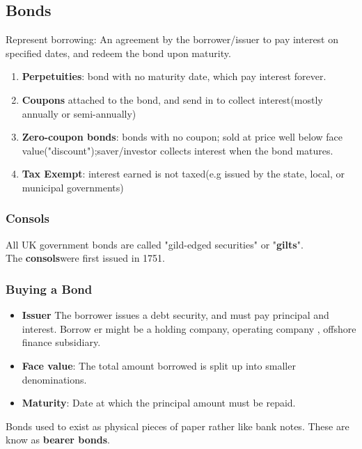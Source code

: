 \documentclass{article}
\theoremstyle{definition}
\theoremstyle{thrm}
\theoremstyle{lma}
\theoremstyle{ppst}
\theoremstyle{crlr}
\begin{document}
\subsection{Bonds}
Represent borrowing: An agreement by the borrower/issuer to pay interest on specified dates, and redeem the bond upon maturity. 
\begin{enumerate}
	\item \textbf{Perpetuities}: bond with no maturity date, which pay interest forever.
	\item \textbf{Coupons} attached to the bond, and send in to collect interest(mostly annually or semi-annually)
	\item \textbf{Zero-coupon bonds}: bonds with no coupon; sold at price well below face value("discount");saver/investor collects interest when the bond matures.
	\item \textbf{Tax Exempt}: interest earned is not taxed(e.g issued by the state, local, or municipal governments)  
\end{enumerate}
\subsubsection{Consols}
All UK government bonds are called "gild-edged securities" or "\textbf{gilts}".\\
The \textbf{consols}were first issued in 1751. 
\subsubsection{Buying a Bond}
\begin{itemize}
	\item \textbf{Issuer} The borrower issues a debt security, and must pay principal and interest. Borrow er might be a holding company, operating company , offshore finance subsidiary. 
	\item \textbf{Face value}: The total amount borrowed is split up into smaller denominations.
	\item \textbf{Maturity}: Date at which the principal amount must be repaid. 
\end{itemize}
Bonds used to exist as physical pieces of paper rather like bank notes. These are know as \textbf{bearer bonds}.
\end{document}
